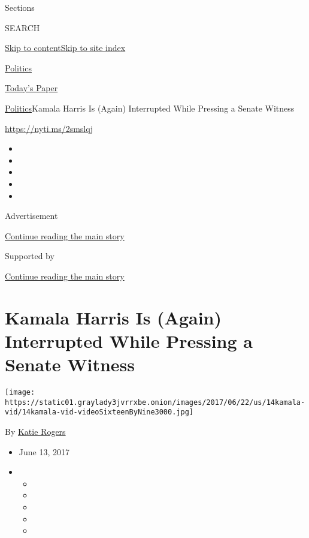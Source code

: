 Sections

SEARCH

\protect\hyperlink{site-content}{Skip to
content}\protect\hyperlink{site-index}{Skip to site index}

\href{https://www.nytimes3xbfgragh.onion/section/politics}{Politics}

\href{https://myaccount.nytimes3xbfgragh.onion/auth/login?response_type=cookie\&client_id=vi}{}

\href{https://www.nytimes3xbfgragh.onion/section/todayspaper}{Today's
Paper}

\href{/section/politics}{Politics}\textbar{}Kamala Harris Is (Again)
Interrupted While Pressing a Senate Witness

\url{https://nyti.ms/2smslqj}

\begin{itemize}
\item
\item
\item
\item
\item
\end{itemize}

Advertisement

\protect\hyperlink{after-top}{Continue reading the main story}

Supported by

\protect\hyperlink{after-sponsor}{Continue reading the main story}

\hypertarget{kamala-harris-is-again-interrupted-while-pressing-a-senate-witness}{%
\section{Kamala Harris Is (Again) Interrupted While Pressing a Senate
Witness}\label{kamala-harris-is-again-interrupted-while-pressing-a-senate-witness}}

\texttt{[image: https://static01.graylady3jvrrxbe.onion/images/2017/06/22/us/14kamala-vid/14kamala-vid-videoSixteenByNine3000.jpg]}

By \href{http://www.nytimes3xbfgragh.onion/by/katie-rogers}{Katie
Rogers}

\begin{itemize}
\item
  June 13, 2017
\item
  \begin{itemize}
  \item
  \item
  \item
  \item
  \item
  \end{itemize}
\end{itemize}

